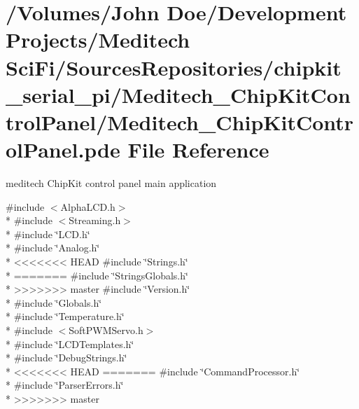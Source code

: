 \hypertarget{_meditech___chip_kit_control_panel_8pde}{\section{/\-Volumes/\-John Doe/\-Development Projects/\-Meditech Sci\-Fi/\-Sources\-Repositories/chipkit\-\_\-serial\-\_\-pi/\-Meditech\-\_\-\-Chip\-Kit\-Control\-Panel/\-Meditech\-\_\-\-Chip\-Kit\-Control\-Panel.pde File Reference}
\label{_meditech___chip_kit_control_panel_8pde}
}


meditech Chip\-Kit control panel main application  


{\ttfamily \#include $<$Alpha\-L\-C\-D.\-h$>$}\\*
{\ttfamily \#include $<$Streaming.\-h$>$}\\*
{\ttfamily \#include \char`\"{}L\-C\-D.\-h\char`\"{}}\\*
{\ttfamily \#include \char`\"{}Analog.\-h\char`\"{}}\\*
<<<<<<< HEAD
{\ttfamily \#include \char`\"{}Strings.\-h\char`\"{}}\\*
=======
{\ttfamily \#include \char`\"{}Strings\-Globals.\-h\char`\"{}}\\*
>>>>>>> master
{\ttfamily \#include \char`\"{}Version.\-h\char`\"{}}\\*
{\ttfamily \#include \char`\"{}Globals.\-h\char`\"{}}\\*
{\ttfamily \#include \char`\"{}Temperature.\-h\char`\"{}}\\*
{\ttfamily \#include $<$Soft\-P\-W\-M\-Servo.\-h$>$}\\*
{\ttfamily \#include \char`\"{}L\-C\-D\-Templates.\-h\char`\"{}}\\*
{\ttfamily \#include \char`\"{}Debug\-Strings.\-h\char`\"{}}\\*
<<<<<<< HEAD
=======
{\ttfamily \#include \char`\"{}Command\-Processor.\-h\char`\"{}}\\*
{\ttfamily \#include \char`\"{}Parser\-Errors.\-h\char`\"{}}\\*
>>>>>>> master
